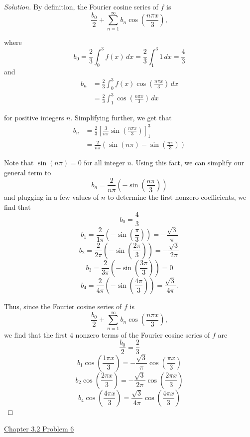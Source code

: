 \documentclass[11pt]{article}
\newenvironment{solution}
  {\renewcommand\qedsymbol{$\blacksquare$}\begin{proof}[Solution]}
  {\end{proof}}
\begin{document}
\begin{solution}
By definition, the Fourier cosine series of $f$ is \[ \frac{b_0}{2} + \sum\limits_{n=1}^{\infty} b_n \cos\left(\frac{n\pi x}{3}\right),\]

where \[b_0 = \frac{2}{3}\int_{0}^{3} f(x) \, dx = \frac{2}{3}\int_{1}^3 1 \, dx = \frac{4}{3}\] and 
\begin{align*} b_n &= \frac{2}{3} \int_0^3 f(x) \cos\left(\frac{n\pi x}{3}\right) \, dx \\
&= \frac{2}{3} \int_1^3 \cos\left(\frac{n\pi x}{3}\right) \, dx\end{align*}

for positive integers $n$. Simplifying further, we get that \begin{align*}b_n &= \frac{2}{3} \left[ \frac{3}{n\pi} \sin\left( \frac{n\pi x}{3}\right)\right]_1^3 \\ 
&=  \frac{2}{n\pi} \left( \sin(n\pi) - \sin\left( \frac{n\pi}{3}\right)\right)\end{align*}

Note that $\sin(n\pi) = 0$ for all integer $n$. Using this fact, we can simplify our general term to
\[ b_n = \frac{2}{n\pi} \left( -\sin\left( \frac{n\pi}{3}\right)\right)\]and plugging in a few values of $n$ to determine the first nonzero coefficients, we find that
\[b_0 = \frac{4}{3}\]
\[b_1 = \frac{2}{1\pi}\left( -\sin\left(\frac{\pi}{3}\right) \right) = -\frac{\sqrt{3}}{\pi}\]
\[b_2 = \frac{2}{2\pi}\left( -\sin\left(\frac{2\pi}{3}\right) \right) = -\frac{\sqrt{3}}{2\pi}\]
\[b_3 = \frac{2}{3\pi}\left( -\sin\left(\frac{3\pi}{3}\right) \right) = 0\]
\[b_4 = \frac{2}{4\pi}\left( -\sin\left(\frac{4\pi}{3}\right) \right) = \frac{\sqrt{3}}{4\pi}.\]

Thus, since the Fourier cosine series of $f$ is \[ \frac{b_0}{2} + \sum\limits_{n=1}^{\infty} b_n \cos\left(\frac{n\pi x}{3}\right),\] we find that the first $4$ nonzero terms of the Fourier cosine series of $f$ are
\[ \frac{b_0}{2} = \boxed{\frac{2}{3}} \]
\[ b_1\cos\left( \frac{1\pi x}{3}\right) = \boxed{-\frac{\sqrt{3}}{\pi}\cos\left(\frac{\pi x}{3}\right)}\]
\[ b_2\cos\left( \frac{2\pi x}{3}\right) = \boxed{-\frac{\sqrt{3}}{2\pi}\cos\left(\frac{2\pi x}{3}\right)}\]
\[ b_4\cos\left( \frac{4\pi x}{3}\right) = \boxed{\frac{\sqrt{3}}{4\pi}\cos\left(\frac{4\pi x}{3}\right)}\]

\end{solution}

\newpage

\underline{Chapter 3.2 Problem 6} \\
\end{document}

